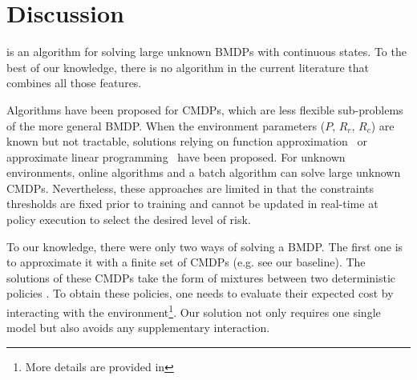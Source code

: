 \documentclass{article}
\begin{document}
\section{Discussion}
\label{subsec:discussions}
 is an algorithm for solving large unknown BMDPs with continuous states. To the best of our knowledge, there is no algorithm in the current literature that combines all those features.


Algorithms have been proposed for CMDPs, which are less flexible sub-problems of the more general BMDP. When the environment parameters ($P$, $R_r$, $R_c$) are known but not tractable, solutions relying on function approximation~\citep{Undurti} or approximate linear programming~\citep{Poupart2015} have been proposed. For unknown environments, online algorithms \citep{Geibel2005, Abe2010,ChowGJP15,AchiamHTA17} and a batch algorithm \citep{Thomas2015, Petrik2016, Laroche2019,le2019batch} can solve large unknown CMDPs. Nevertheless, these approaches are limited in that the constraints thresholds are fixed prior to training and cannot be updated in real-time at policy execution to select the desired level of risk.

To our knowledge, there were only two ways of solving a BMDP. The first one is to approximate it with a finite set of CMDPs (e.g. see our \FTQl baseline). The solutions of these CMDPs take the form of mixtures between two deterministic policies \citep[Theorem 4.4,][]{BEUTLER1985236}. To obtain these policies, one needs to evaluate their expected cost by interacting with the environment\footnote{More details are provided in }. Our solution not only requires one single model but also avoids any supplementary interaction.
\end{document}
